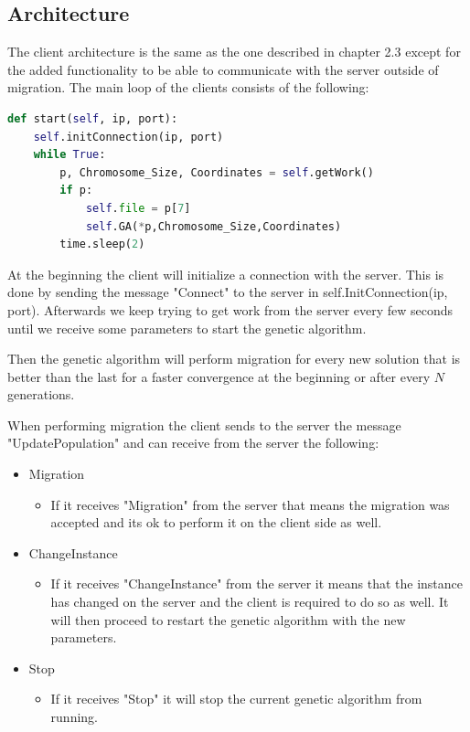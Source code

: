 \subsection{Architecture}
The client architecture is the same as the one described in chapter 2.3 except for the added functionality to be able to communicate with the server outside of migration.
\newline
The main loop of the clients consists of the following:
\begin{lstlisting}[language=Python]
def start(self, ip, port):
    self.initConnection(ip, port)
    while True:
        p, Chromosome_Size, Coordinates = self.getWork()
        if p:
            self.file = p[7]
            self.GA(*p,Chromosome_Size,Coordinates)
        time.sleep(2)
\end{lstlisting}
At the beginning the client will initialize a connection with the server. This is done by sending the message "Connect" to the server in self.InitConnection(ip, port). Afterwards we keep trying to get work from the server every few seconds until we receive some parameters to start the genetic algorithm.
\par
Then the genetic algorithm will perform migration for every new solution that is better than the last for a faster convergence at the beginning or after every $N$ generations.
\par
When performing migration the client sends to the server the message "UpdatePopulation" and can receive from the server the following:
\begin{itemize}
  \item Migration
     \begin{itemize}
        \item If it receives "Migration" from the server that means the migration was accepted and its ok to perform it on the client side as well.
     \end{itemize}
  \item ChangeInstance
   \begin{itemize}
    \item If it receives "ChangeInstance" from the server it means that the instance has changed on the server and the client is required to do so as well. It will then proceed to restart the genetic algorithm with the new parameters.
    \end{itemize}
  \item Stop
     \begin{itemize}
    \item If it receives "Stop" it will stop the current genetic algorithm from running.
    \end{itemize}
\end{itemize}

